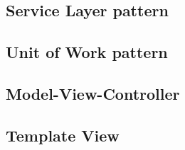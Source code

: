 \subsection{Service Layer pattern}
\label{sec:service-layer-pattern}

\subsection{Unit of Work pattern}
\label{sec:unit-of-work-pattern}



\subsection{Model-View-Controller}
\label{sec:mvc}

\subsection{Template View}
\label{sec:template-view}

